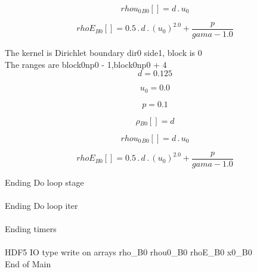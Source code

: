 \documentclass{article}
\begin{document}
\begin{dmath}{rhou_{0}{_{B0}}}[{}] = d \,.\, u_{0}\end{dmath}

\begin{dmath}{rhoE{_{B0}}}[{}] = 0.5 \,.\, d \,.\, \left(u_{0} \right)^{2.0} + \frac{p}{gama - 1.0}\end{dmath}

\noindent The kernel is Dirichlet boundary dir0 side1, block is 0\\\noindent The ranges are block0np0 - 1,block0np0 + 4\\\begin{dmath}d = 0.125\end{dmath}

\begin{dmath}u_{0} = 0.0\end{dmath}

\begin{dmath}p = 0.1\end{dmath}

\begin{dmath}{\rho{_{B0}}}[{}] = d\end{dmath}

\begin{dmath}{rhou_{0}{_{B0}}}[{}] = d \,.\, u_{0}\end{dmath}

\begin{dmath}{rhoE{_{B0}}}[{}] = 0.5 \,.\, d \,.\, \left(u_{0} \right)^{2.0} + \frac{p}{gama - 1.0}\end{dmath}

\noindent Ending Do loop stage\\
\\\noindent Ending Do loop iter\\
\\\noindent Ending timers\\
\\\noindent HDF5 IO type write on arrays rho_B0 rhou0_B0 rhoE_B0 x0_B0\\\noindent End of Main\\
\end{document}
